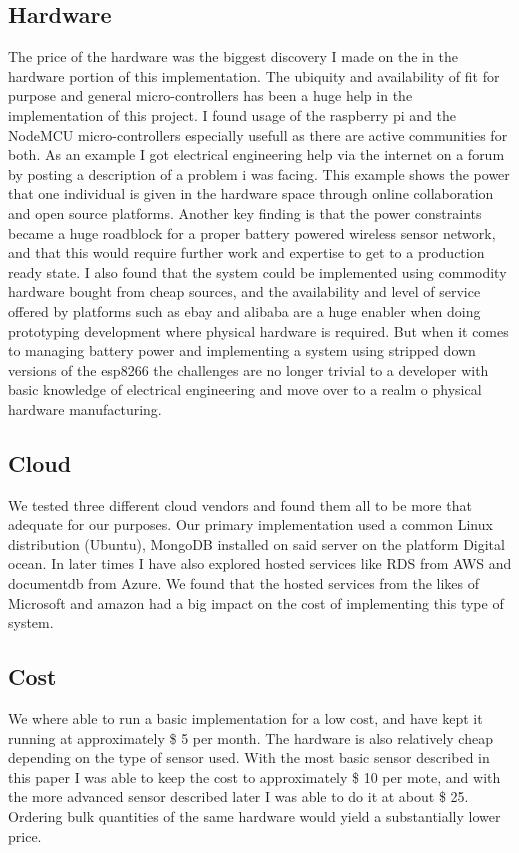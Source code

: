 \documentclass[]{uiophd}
\begin{document}
\subsection{Hardware}
The price of the hardware was the biggest discovery I made on the in the hardware portion of this implementation. The ubiquity and availability of fit for purpose and general micro-controllers has been a huge help in the implementation of this project. I found usage of the raspberry pi and the NodeMCU micro-controllers especially usefull as there are active communities for both. As an example I got electrical engineering help via the internet on a forum by posting a description of a problem i was facing. This example shows the power that one individual is given in the hardware space through online collaboration and open source platforms.  Another key finding is that the power constraints became a huge roadblock for a proper battery powered wireless sensor network, and that this would require further work and expertise to get to a production ready state. I also found that the system could be implemented using commodity hardware bought from cheap sources, and the availability and level of service offered by platforms such as ebay and alibaba are a huge enabler when doing prototyping development where physical hardware is required. But when it comes to managing battery power and implementing a system using stripped down versions of the esp8266 the challenges are no longer trivial to a developer with basic knowledge of electrical engineering and move over to a realm o physical hardware manufacturing.

\subsection{Cloud}
We tested three different cloud vendors and found them all to be more that adequate for our purposes. Our primary implementation used a common Linux distribution (Ubuntu), MongoDB installed on said server on the platform Digital ocean. In later times I have also explored hosted services like RDS from AWS and documentdb from Azure. We found that the hosted services from the likes of Microsoft and amazon had a big impact on the cost of implementing this type of system.

\subsection{Cost}
We where able to run a basic implementation for a low cost, and have kept it running at approximately \$ 5 per month. The hardware is also relatively cheap depending on the type of sensor used. With the most basic sensor described in this paper I was able to keep the cost to approximately \$ 10 per mote, and with the more advanced sensor described later I was able to do it at about \$ 25. Ordering bulk quantities of the same hardware would yield a substantially lower price.
\end{document}
